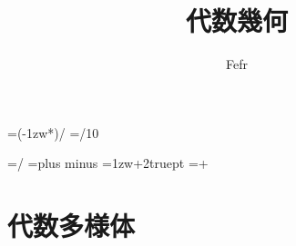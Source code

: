 \documentclass[dvipdfmx,a4paper,11pt]{jsarticle}
\begin{document}
\theoremstyle{plain}
\newtheorem{thm}{Theorem}[section]
\newtheorem{lem}[thm]{Lemma}
\newtheorem{prop}[thm]{Proposition}
\newtheorem{cor}[thm]{Corollary}
\newtheorem{conj}[thm]{Conjecture}

\theoremstyle{definition}
\newtheorem{ass}[thm]{Assumption}
\newtheorem{dfn}[thm]{Definition}

\theoremstyle{remark}
\newtheorem{rem}[thm]{Remark}

\theoremstyle{plain}
\newtheorem*{thm*}{Theorem}
\newtheorem*{lem*}{Lemma}
\newtheorem*{prop*}{Proposition}
\newtheorem*{cor*}{Corollary}
\newtheorem*{conj*}{Conjecture}

\theoremstyle{definition}
\newtheorem*{ass*}{Assumption}
\newtheorem*{dfn*}{Definition}

\theoremstyle{remark}
\newtheorem*{Proof}{Proof}


\theoremstyle{remark}
\newtheorem*{rem*}{Remark}

\setlength{\footskip}{20truemm}



\makeatletter
\newcount\@chars\newcount\@lines
{}                      %

\newdimen\@kanjiskip
\@kanjiskip=\dimexpr(\textwidth-1zw*\@chars)/\numexpr{}
\newdimen\@@kanjiskip
\@@kanjiskip=\dimexpr\@kanjiskip/10

\baselineskip=\dimexpr\textheight/\@lines
\kanjiskip=\@kanjiskip plus \@@kanjiskip minus \@@kanjiskip
\parindent=\dimexpr 1zw+2truept
\parindent=\dimexpr\parindent+\@kanjiskip
\makeatother


\title{代数幾何}
\date{}
\author{Fefr}
\maketitle
\tableofcontents
\clearpage

\section{代数多様体}
\end{document}
